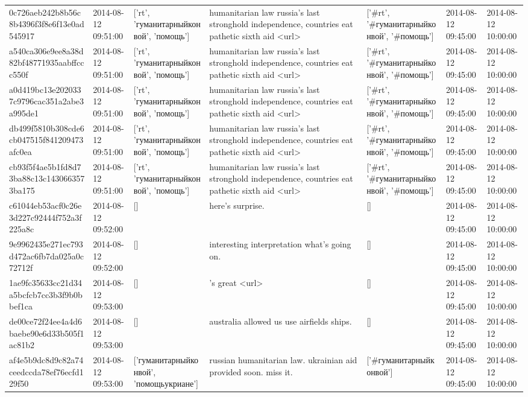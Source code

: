 \begin{tabular}{lllllll}
0c726aeb242b8b56c8b4396f3f8e6f13e0ad545917 & 2014-08-12 09:51:00 & ['rt', 'гуманитарныйконвой', 'помощь'] & humanitarian law russia's last stronghold independence, countries eat pathetic sixth aid <url> & ['#rt', '#гуманитарныйконвой', '#помощь'] & 2014-08-12 09:45:00 & 2014-08-12 10:00:00 \\
a540ca306e9ee8a38d82bf48771935aabffccc550f & 2014-08-12 09:51:00 & ['rt', 'гуманитарныйконвой', 'помощь'] & humanitarian law russia's last stronghold independence, countries eat pathetic sixth aid <url> & ['#rt', '#гуманитарныйконвой', '#помощь'] & 2014-08-12 09:45:00 & 2014-08-12 10:00:00 \\
a0d419bc13e2020337c9796cac351a2abe3a995de1 & 2014-08-12 09:51:00 & ['rt', 'гуманитарныйконвой', 'помощь'] & humanitarian law russia's last stronghold independence, countries eat pathetic sixth aid <url> & ['#rt', '#гуманитарныйконвой', '#помощь'] & 2014-08-12 09:45:00 & 2014-08-12 10:00:00 \\
db499f5810b308cde6cb047515f841209473afc0ea & 2014-08-12 09:51:00 & ['rt', 'гуманитарныйконвой', 'помощь'] & humanitarian law russia's last stronghold independence, countries eat pathetic sixth aid <url> & ['#rt', '#гуманитарныйконвой', '#помощь'] & 2014-08-12 09:45:00 & 2014-08-12 10:00:00 \\
cb93f5f4ae5b1fd8d73ba88c13c1430663573ba175 & 2014-08-12 09:51:00 & ['rt', 'гуманитарныйконвой', 'помощь'] & humanitarian law russia's last stronghold independence, countries eat pathetic sixth aid <url> & ['#rt', '#гуманитарныйконвой', '#помощь'] & 2014-08-12 09:45:00 & 2014-08-12 10:00:00 \\
c61044eb53acf0c26e3d227c92444f752a3f225a8c & 2014-08-12 09:52:00 & [] & here's surprise. & [] & 2014-08-12 09:45:00 & 2014-08-12 10:00:00 \\
9e9962435e271ec793d472ac6fb7da025a0c72712f & 2014-08-12 09:52:00 & [] & interesting interpretation what's going on. & [] & 2014-08-12 09:45:00 & 2014-08-12 10:00:00 \\
1ae9fc35633cc21d34a5bcfcb7cc3b3f9b0bbef1ca & 2014-08-12 09:53:00 & [] & 's great <url> & [] & 2014-08-12 09:45:00 & 2014-08-12 10:00:00 \\
de00ce72f24ee4a4d6baebe90e6d33b505f1ac81b2 & 2014-08-12 09:53:00 & [] & australia allowed us use airfields ships. & [] & 2014-08-12 09:45:00 & 2014-08-12 10:00:00 \\
af4e5b9dc8d9c82a74ceedccda78ef76ecfd129f50 & 2014-08-12 09:53:00 & ['гуманитарныйконвой', 'помощьукриане'] & russian humanitarian law. ukrainian aid provided soon. miss it. & ['#гуманитарныйконвой'] & 2014-08-12 09:45:00 & 2014-08-12 10:00:00 \\

\end{tabular}
